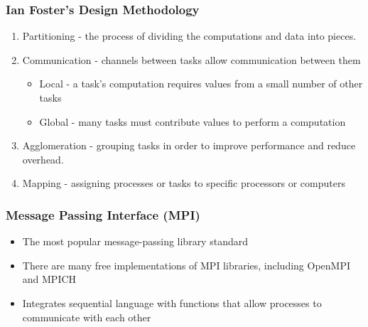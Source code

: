 \documentclass[13pt]{beamer}
\begin{document}
\begin{frame}
\frametitle{Ian Foster's Design Methodology}
  \begin{enumerate}
    \item \alert{Partitioning} - the process of dividing the computations and data into pieces.
    \item \alert{Communication} - channels between tasks allow communication between them
          \begin{itemize}
            \item Local - a task's computation requires values from a small number of other tasks
            \item Global - many tasks must contribute values to perform a computation
          \end{itemize}
    \item \alert{Agglomeration} - grouping tasks in order to improve performance and reduce overhead.
    \item \alert{Mapping} - assigning processes or tasks to specific processors or computers
  \end{enumerate}
\end{frame}

\begin{frame}
\frametitle{Message Passing Interface (MPI)}
\begin{itemize}
  \item The most popular message-passing library standard %
  \item There are many free implementations of MPI libraries, including OpenMPI and MPICH
  \item Integrates sequential language with functions that allow processes to communicate with each other
\end{itemize}
\end{frame}
\end{document}
